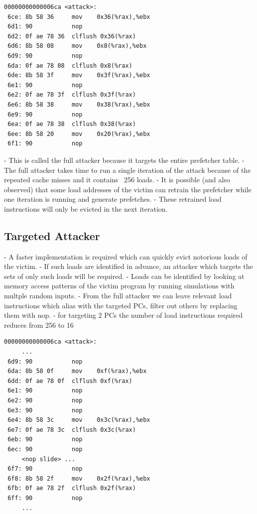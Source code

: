 \documentclass[conference]{IEEEtran}
\begin{document}
\begin{lstlisting}[caption={Full Attacker disassembly: load misses at different PCs},
label={lst:full_attack}]
00000000000006ca <attack>:
 6ce: 8b 58 36     mov    0x36(%rax),%ebx
 6d1: 90           nop
 6d2: 0f ae 78 36  clflush 0x36(%rax)
 6d6: 8b 58 08     mov    0x8(%rax),%ebx
 6d9: 90           nop
 6da: 0f ae 78 08  clflush 0x8(%rax)
 6de: 8b 58 3f     mov    0x3f(%rax),%ebx
 6e1: 90           nop
 6e2: 0f ae 78 3f  clflush 0x3f(%rax)
 6e6: 8b 58 38     mov    0x38(%rax),%ebx
 6e9: 90           nop
 6ea: 0f ae 78 38  clflush 0x38(%rax)
 6ee: 8b 58 20     mov    0x20(%rax),%ebx
 6f1: 90           nop
\end{lstlisting}

 - This is called the full attacker because it targets the
   entire prefetcher table.
 - The full attacker takes time to run a single iteration of the attack
   because of the repeated cache misses and it contains ~256 loads.
 - It is possible (and also observed) that some load addresses of the victim
   can retrain the prefetcher while one iteration is running and generate
   prefetches.
 - These retrained load instructions will only be evicted in the next iteration.

\subsection{Targeted Attacker}
 - A faster implementation is required which can quickly evict notorious loads
   of the victim.
 - If such loads are identified in advance, an attacker which targets the
   sets of only such loads will be required.
 - Loads can be identified by looking at memory access patterns of the victim
   program by running simulations with multple random inputs.
 - From the full attacker we can leave relevant load instructions which
   alias with the targeted PCs, filter out others by replacing them with nop.
 - for targeting 2 PCs the number of load instructions required reduces from 256 to 16

\begin{lstlisting}[caption={Targeted attacker disassembly: loads at aliased PCs},
label={lst:targeted_attack}]
00000000000006ca <attack>:
     ...
 6d9: 90           nop
 6da: 8b 58 0f     mov    0xf(%rax),%ebx
 6dd: 0f ae 78 0f  clflush 0xf(%rax)
 6e1: 90           nop
 6e2: 90           nop
 6e3: 90           nop
 6e4: 8b 58 3c     mov    0x3c(%rax),%ebx
 6e7: 0f ae 78 3c  clflush 0x3c(%rax)
 6eb: 90           nop
 6ec: 90           nop
     <nop slide> ...
 6f7: 90           nop
 6f8: 8b 58 2f     mov    0x2f(%rax),%ebx
 6fb: 0f ae 78 2f  clflush 0x2f(%rax)
 6ff: 90           nop
     ...
\end{lstlisting}
\end{document}

